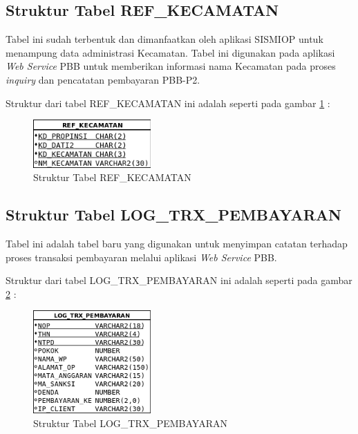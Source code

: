 \documentclass[pdftex,12pt, oneside]{article}
\begin{document}
\subsection{Struktur Tabel REF\_KECAMATAN}

Tabel ini sudah terbentuk dan dimanfaatkan oleh aplikasi SISMIOP untuk menampung data administrasi Kecamatan. Tabel ini digunakan pada aplikasi \textit{Web Service} PBB untuk memberikan informasi nama Kecamatan pada proses \textit{inquiry} dan pencatatan pembayaran PBB-P2.

Struktur dari tabel REF\_KECAMATAN ini adalah seperti pada gambar \ref{fig:tabel-ref-kecamatan} :

\begin{figure}[H]
	\centering
	\includegraphics[width=0.4\textwidth]{./resources/05-struktur-tabel-ref-kecamatan}
	\caption{Struktur Tabel REF\_KECAMATAN}
	\label{fig:tabel-ref-kecamatan}
\end{figure}

\subsection{Struktur Tabel LOG\_TRX\_PEMBAYARAN}

Tabel ini adalah tabel baru yang digunakan untuk menyimpan catatan terhadap proses transaksi pembayaran melalui aplikasi \textit{Web Service} PBB.

Struktur dari tabel LOG\_TRX\_PEMBAYARAN ini adalah seperti pada gambar \ref{fig:tabel-log-trx-pembayaran} :

\begin{figure}[H]
  \centering
  \includegraphics[width=0.4\textwidth]{./resources/06-struktur-tabel-log-trx-pembayaran}
  \caption{Struktur Tabel LOG\_TRX\_PEMBAYARAN}
  \label{fig:tabel-log-trx-pembayaran}
\end{figure}
\end{document}
